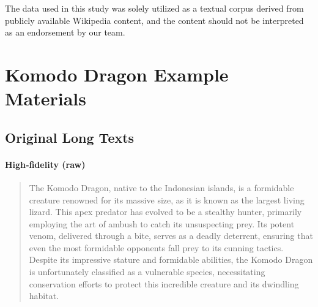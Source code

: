 \documentclass[11pt]{article}
\begin{document}
The data used in this study was solely utilized as a textual corpus derived from publicly available Wikipedia content, and the content should not be interpreted as an endorsement by our team.  




%



\appendix
\section{Komodo Dragon Example Materials} \label{appendix:dragon_example}
\subsection{Original Long Texts}

\paragraph{High‑fidelity (raw)}
\begin{quote}
The Komodo Dragon, native to the Indonesian islands, is a formidable creature renowned for its massive size, as it is known as the largest living lizard. This apex predator has evolved to be a stealthy hunter, primarily employing the art of ambush to catch its unsuspecting prey. Its potent venom, delivered through a bite, serves as a deadly deterrent, ensuring that even the most formidable opponents fall prey to its cunning tactics. Despite its impressive stature and formidable abilities, the Komodo Dragon is unfortunately classified as a vulnerable species, necessitating conservation efforts to protect this incredible creature and its dwindling habitat.
\end{quote}
\end{document}
